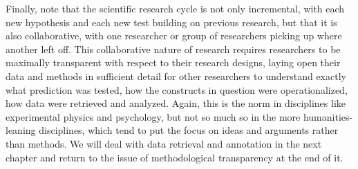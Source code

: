 Finally, note that the scientific research cycle is not only incremental, with each new hypothesis  and each new test building on previous research, but that it is also collaborative, with one researcher or group of researchers picking up where another left off. This collaborative nature of research requires researchers to be maximally transparent with respect to their research designs,  laying open their data and methods in sufficient detail for other researchers to understand exactly what prediction was tested, how the constructs in question were operationalized,  how data were retrieved  and analyzed. Again, this is the norm in disciplines like experimental  physics and psychology,  but not so much so in the more humanities\hyp{}leaning  disciplines, which tend to put the focus on ideas and arguments rather than methods. We will deal with data retrieval and annotation  in the next chapter and return to the issue of methodological transparency at the end of it.
